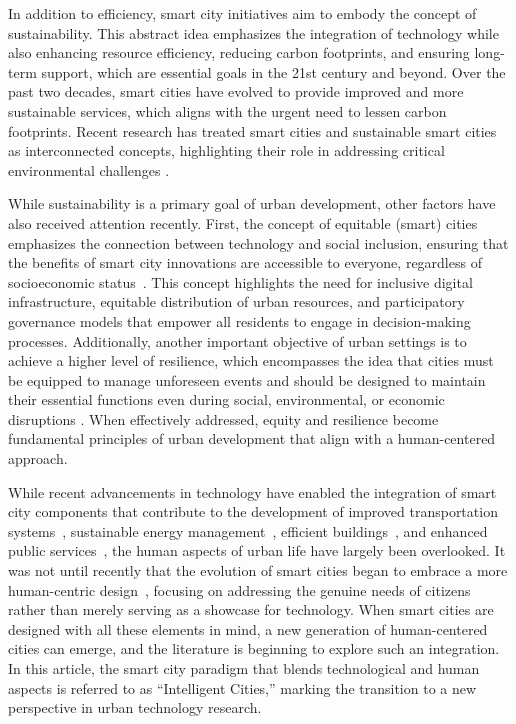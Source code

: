 \documentclass[smartcities,article,submit,pdftex,moreauthors]{Definitions/mdpi}
\begin{document}
In addition to efficiency, smart city initiatives aim to embody the concept of sustainability. This abstract idea emphasizes the integration of technology while also enhancing resource efficiency, reducing carbon footprints, and ensuring long-term support, which are essential goals in the 21st century and beyond. Over the past two decades, smart cities have evolved to provide improved and more sustainable services, which aligns with the urgent need to lessen carbon footprints. Recent research has treated smart cities and sustainable smart cities as interconnected concepts, highlighting their role in addressing critical environmental challenges \cite{sustainableCities}.

While sustainability is a primary goal of urban development, other factors have also received attention recently. First, the concept of equitable (smart) cities emphasizes the connection between technology and social inclusion, ensuring that the benefits of smart city innovations are accessible to everyone, regardless of socioeconomic status~\cite{equitableSC1}. This concept highlights the need for inclusive digital infrastructure, equitable distribution of urban resources, and participatory governance models that empower all residents to engage in decision-making processes. Additionally, another important objective of urban settings is to achieve a higher level of resilience, which encompasses the idea that cities must be equipped to manage unforeseen events and should be designed to maintain their essential functions even during social, environmental, or economic disruptions \cite{resilienceSC1,resilienceSC2}. When effectively addressed, equity and resilience become fundamental principles of urban development that align with a human-centered approach.

While recent advancements in technology have enabled the integration of smart city components that contribute to the development of improved transportation systems~\cite{barodiIntelligentTransportationSystem2023}, sustainable energy management~\cite{muhammadDeepReinforcementLearningBasedSustainableEnergy2021}, efficient buildings~\cite{ML_SmartBuildings_2022,SmartBuilding_Integration_2020}, and enhanced public services~\cite{minardiSemanticReasoningGeolocalized2023}, the human aspects of urban life have largely been overlooked. It was not until recently that the evolution of smart cities began to embrace a more human-centric design~\cite{svitekSmartCityUrban2020,talebkhahReviewSmartCityIndustry402023}, focusing on addressing the genuine needs of citizens rather than merely serving as a showcase for technology. When smart cities are designed with all these elements in mind, a new generation of human-centered cities can emerge, and the literature is beginning to explore such an integration. In this article, the smart city paradigm that blends technological and human aspects is referred to as ``Intelligent Cities,'' marking the transition to a new perspective in urban technology research.
\end{document}
